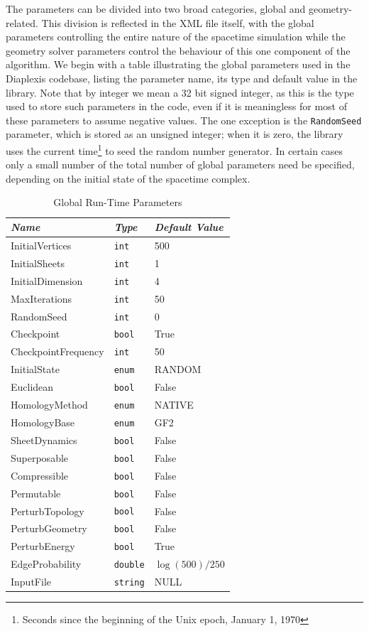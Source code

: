 \documentclass[12pt,letterpaper]{report}
\begin{document}
The parameters can be divided into two broad categories, global and geometry-related. This division 
is reflected in the XML file itself, with the global parameters controlling the entire nature of 
the spacetime simulation while the geometry solver parameters control the behaviour of this one 
component of the algorithm. We begin with a table illustrating the global parameters used in the 
Diaplexis codebase, listing the parameter name, its type and default value in the library. Note that 
by integer we mean a 32 bit signed integer, as this is the type used to store such parameters in 
the code, even if it is meaningless for most of these parameters to assume negative values. The 
one exception is the \texttt{RandomSeed} parameter, which is stored as an unsigned integer; when it 
is zero, the library uses the current time\footnote{Seconds since the beginning of the Unix epoch, 
January 1, 1970} to seed the random number generator. In certain cases only a small number of the 
total number of global parameters need be specified, depending on the initial state of the 
spacetime complex.
\begin{table}[htbp]
\centering
\begin{tabular}{|l|l|l|}
\hline
\emph{Name} & \emph{Type} & \emph{Default Value} \\ 
\hline \hline
InitialVertices & \texttt{int} & 500 \\ 
InitialSheets & \texttt{int} & 1 \\
InitialDimension & \texttt{int} & 4 \\ 
MaxIterations & \texttt{int} & 50 \\
RandomSeed & \texttt{int} & 0 \\
Checkpoint & \texttt{bool} & True \\ 
CheckpointFrequency & \texttt{int} & 50 \\
InitialState & \texttt{enum} & RANDOM \\ 
Euclidean & \texttt{bool} & False \\
HomologyMethod & \texttt{enum} & NATIVE \\
HomologyBase & \texttt{enum} & GF2 \\
SheetDynamics & \texttt{bool} & False \\
Superposable & \texttt{bool} & False \\
Compressible & \texttt{bool} & False \\ 
Permutable & \texttt{bool} & False \\
PerturbTopology & \texttt{bool} & False \\
PerturbGeometry & \texttt{bool} & False \\
PerturbEnergy & \texttt{bool} & True \\
EdgeProbability & \texttt{double} & $\log(500)/250$ \\
InputFile & \texttt{string} & NULL \\ 
\hline
\end{tabular}
\caption{Global Run-Time Parameters}
\label{rt_parms1}
\end{table}
\end{document}
